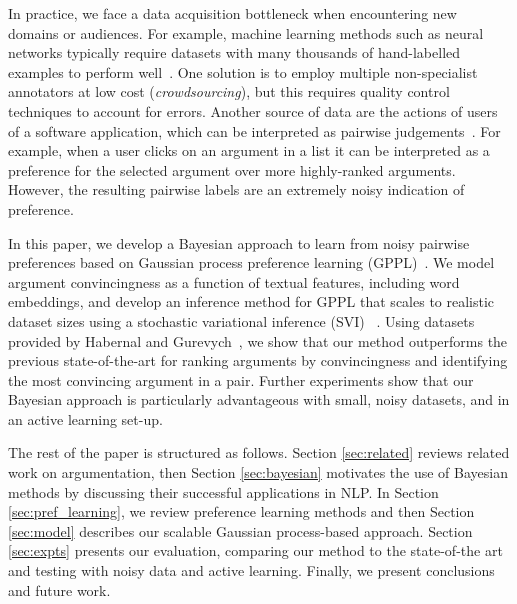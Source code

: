 In practice, we face a data acquisition bottleneck when encountering new domains or audiences.
For example, machine learning methods such as neural networks typically require datasets with 
many thousands of hand-labelled examples to perform well~\cite{srivastava2014dropout,collobert2011natural}.
One solution is to employ multiple non-specialist annotators at low cost (\emph{crowdsourcing}), 
but this requires quality control techniques to account for errors.
Another source of data are the actions of users of a software application, which can be interpreted as pairwise judgements~\cite{joachims2002optimizing}. For example, when a user clicks on an argument in a list it can be interpreted
 as a preference for the selected argument over more highly-ranked arguments.
However, the resulting pairwise labels are an extremely noisy indication of preference.

In this paper, we develop a Bayesian approach to learn from noisy pairwise preferences
based on Gaussian process preference learning (GPPL)~\cite{chu2005preference}.
We model argument convincingness as a function of textual features, including word embeddings,
and develop an inference method for GPPL that scales to realistic dataset sizes using a stochastic variational inference (SVI) ~\cite{hoffman2013stochastic}. %
Using datasets provided by Habernal and Gurevych~,
we show that our method outperforms the previous state-of-the-art for ranking arguments by convincingness 
and identifying the most convincing argument in a pair. 
Further experiments show that our Bayesian approach is particularly advantageous with small, noisy datasets, 
and in an active learning set-up.

The rest of the paper is structured as follows.
Section \ref{sec:related} reviews related work on argumentation,
then Section \ref{sec:bayesian} motivates the use of Bayesian methods by discussing their successful applications in NLP.
In Section \ref{sec:pref_learning}, we review preference learning methods and then Section \ref{sec:model}
describes our scalable Gaussian process-based approach.
Section \ref{sec:expts} presents our evaluation, 
comparing our method to the state-of-the art and testing with noisy data and active learning.
Finally, we present conclusions and future work.


